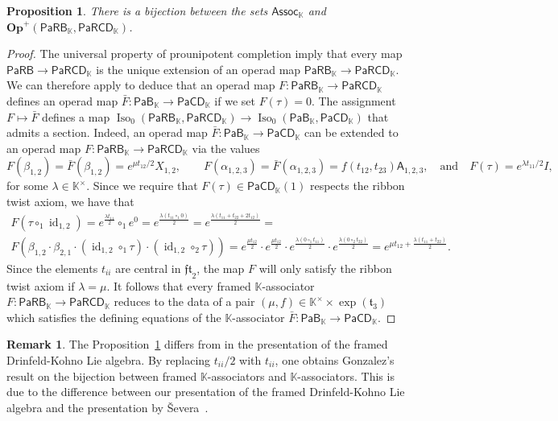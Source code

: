 \documentclass{amsart}
\newcommand{\kk}{\mathbb{K}}    %
\newcommand{\PaRB}{\mathsf{PaRB}}
\newcommand{\PaRCD}{\mathsf{PaRCD}}
\newcommand{\PaCD}{\mathsf{PaCD}}
\newcommand{\A}{\mathsf{A}}
\newcommand{\hPaB}{{\PaB}_{\kk}}
\newcommand{\hPaCD}{{\PaCD}_{\kk}}
\newcommand{\hPaRB}{{\PaRB}_{\kk}}
\newcommand{\hPaRCD}{{\PaRCD}_{\kk}}
\newcommand{\PaB}{\mathsf{PaB}}
\newcommand{\Op}{\mathbf{Op}}
\newcommand{\id}{\operatorname{id}}
\newcommand{\Iso}{\operatorname{Iso}}
\newcommand{\lrar}{\ensuremath{\longrightarrow}}
\newcommand{\ft}{\mathfrak{t}}
\newtheorem{prop}[theorem]{Proposition}%
\theoremstyle{definition}
\newtheorem{remark}[theorem]{Remark}%
\numberwithin{equation}{section}
\begin{document}
\begin{prop}\label{prop:bijection framed Assoc and Assoc}
There is a bijection between the sets $\mathsf{Assoc}_{\kk}$ and $\Op^{+}(\hPaRB, \hPaRCD)$. 
\end{prop}

\begin{proof}
The universal property of prounipotent completion imply that every map $\PaRB\rightarrow \hPaRCD$ is the unique extension of an operad map $\hPaRB\rightarrow \hPaRCD$.  We can therefore apply \cite[Lemma 7.4 ]{Boavida-Horel-Robertson} to deduce that an operad map $F: \hPaRB \lrar \hPaRCD$ defines an operad map $\bar{F}:\hPaB\rightarrow \hPaCD$ if we set $F(\tau) =0$. The assignment $F\mapsto \bar{F}$ defines a map $\Iso_{0}(\hPaRB, \hPaRCD)\rightarrow \Iso_{0}(\hPaB, \hPaCD)$ that admits a section.  Indeed, an operad map $\bar{F}: \hPaB\lrar \hPaCD$ can be extended to an operad map $F: \hPaRB \lrar \hPaRCD$ via the values \[F(\beta_{1,2}) =\bar{F}(\beta_{1,2}) = e^{\mu t_{12}/2} X_{1,2}, \qquad F(\alpha_{1,2,3}) =\bar{F}(\alpha_{1,2,3}) = f(t_{12}, t_{23}) \A_{1,2,3}, \quad \text{and} \quad F(\tau) = e^{\lambda t_{11}/2} I, \] for some $\lambda\in \kk^{\times}$. Since we require that $F(\tau)\in\hPaCD(1)$ respects the ribbon twist axiom, we have that
\begin{multline}
    F(\tau \circ_1 \id_{1,2}) = e^{\frac{\lambda t_{11}}{2}} \circ_1 e^{0} = e^{\frac{\lambda (t_{11} \circ_1 0)}{2}} = e^{\frac{\lambda(t_{11}+t_{22}+ 2 t_{12})}{2}} =\\
    F(\beta_{1,2} \cdot \beta_{2,1}\cdot (\id_{1,2} \circ_1 \tau) \cdot (\id_{1,2} \circ_2 \tau)) = e^{\frac{\mu t_{12}}{2}} \cdot e^{\frac{\mu t_{12}}{2}} \cdot e^{\frac{\lambda (0 \circ_1 t_{11})}{2}} \cdot e^{\frac{\lambda (0 \circ_2 t_{22})}{2}} = e^{\mu t_{12} + \frac{\lambda(t_{11}+ t_{22})}{2}}.
\end{multline} Since the elements $t_{ii}$ are central in $\mathfrak{ft}_2$, the map $F$ will only satisfy the ribbon twist axiom if $\lambda = \mu$. It follows that every framed $\kk$-associator $F:\hPaRB \lrar \hPaRCD$ reduces to the data of a pair $(\mu, f)\in \kk^{\times} \times \exp(\ft_3)$ which satisfies the defining equations of the $\kk$-associator $\bar{F}:\hPaB \lrar \hPaCD$. 
\end{proof}

\begin{remark}
The Proposition~\ref{prop:bijection framed Assoc and Assoc} differs from \cite[Proposition 5.3]{gonzalez2018contributions} in the presentation of the framed Drinfeld-Kohno Lie algebra. By replacing $t_{ii}/2$ with $t_{ii}$, one obtains Gonzalez's result on the bijection between framed $\kk$-associators and $\kk$-associators. This is due to the difference between our presentation of the framed Drinfeld-Kohno Lie algebra and the presentation by Ševera~\cite{severa2009formality}. 
\end{remark}
\end{document}
